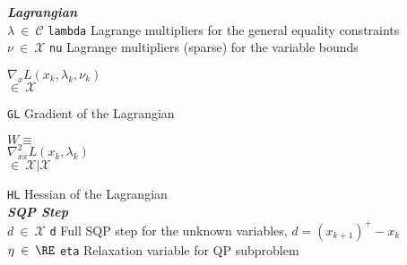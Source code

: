 {\begin{tabbing}
\textbf{\textit{Lagrangian}} \\
$\lambda \:\in\: \mathcal{C}$
	\> \texttt{lambda}
		\> Lagrange multipliers for the general equality constraints  \\
$\nu \:\in\: \mathcal{X}$
	\> \texttt{nu}
		\> Lagrange multipliers (sparse) for the variable bounds  \\
\begin{minipage}[t]{1.0in}
$\nabla_x L(x_k,\lambda_k,\nu_k)$ \\
\hspace*{6ex}$\in\:\mathcal{X}$\\
\end{minipage}
	\> \texttt{GL}
		\> Gradient of the Lagrangian \\
\begin{minipage}[t]{25ex}
$W \equiv$ \\
$\nabla_{xx}^2 L(x_k,\lambda_k)$ \\
\hspace*{6ex}$\in\:\mathcal{X}|\mathcal{X}$
\end{minipage}
	\> \texttt{HL}
		\> Hessian of the Lagrangian \\

\textbf{\textit{SQP Step}} \\
$d \:\in\: \mathcal{X}$
	\> \texttt{d}
		\> Full SQP step for the unknown variables, $d = (x_{k+1})^{+} - x_{k}$ \\
$\eta \:\in\: \RE$
	\> \texttt{eta}
		\> Relaxation variable for QP subproblem \\


\end{tabbing}}
